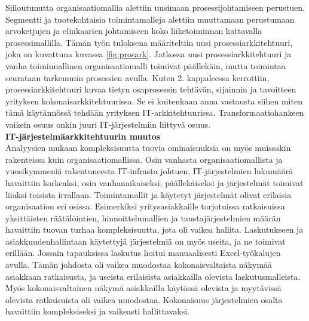 \documentclass[finnish,12pt,a4paper,pdftex]{article}
\begin{document}
Siiloutunutta organisaatiomallia alettiin uusimaan prosessijohtamiseen perustuen. Segmentti ja tuotekohtaisia toimintamalleja alettiin muuttamaan perustumaan arvoketjujen ja elinkaarien johtamiseen koko liiketoiminnan kattavalla prosessimallilla. Tämän työn tuloksena määriteltiin uusi prosessiarkkitehtuuri, joka on kuvattuna kuvassa \ref{fig:prosark}. Jatkossa uusi prosessiarkkitehtuuri ja vanha toiminnallinen organisaatiomalli toimivat päällekäin, mutta toimintaa seurataan tarkemmin prosessien avulla. Kuten 2. kappaleessa kerrottiin, prosessiarkkitehtuuri kuvaa tietyn osaprosessin tehtävän, sijainnin ja tavoitteen yrityksen kokonaisarkkitehtuurissa. Se ei kuitenkaan anna vastausta siihen miten tämä käytännössä tehdään yrityksen IT-arkkitehtuurissa. Transformaatiohankeen vaikein osuus onkin juuri IT-järjestelmiin liittyvä osuus.\\

\textbf{IT-järjestelmäarkkitehtuurin muutos}\\

Analyysien mukaan kompleksisuutta tuovia ominaisuuksia on myös muissakin rakenteissa kuin organisaatiomallissa. Osin vanhasta organisaatiomallista ja vuosikymmeniä rakentuneesta IT-infrasta johtuen, IT-järjestelmien lukumäärä havaittiin korkeaksi, osin vanhanaikaiseksi, päällekäiseksi ja järjestelmät toimivat liiaksi toisista irrallaan. Toimintamallit ja käytetyt järjestelmät olivat erilaisia organisaation eri osissa. Esimerkiksi yritysasiakkaille tarjotuissa ratkaisuissa yksittäisten räätälöintien, hinnoittelumallien ja taustajärjestelmien määrän havaittiin tuovan turhaa kompleksisuutta, jota oli vaikea hallita. Laskutukseen ja asiakkuudenhallintaan käytettyjä järjestelmiä on myös useita, ja ne toimivat erillään. Jossain tapauksissa laskutus hoitui manuaalisesti Excel-työkalujen avulla. Tämän johdosta oli vaikea muodostaa kokonaisvaltaista näkymää asiakkaan ratkaisusta, ja useista erilaisista asiakkailla olevista laskutusmalleista. Myös kokonaisvaltainen näkymä asiakkailla käytössä olevista ja myytävissä olevista ratkaisuista oli vaikea muodostaa. Kokonaisuus järjestelmien osalta havaittiin kompleksiseksi ja vaikeasti hallittavaksi.\\
\end{document}
